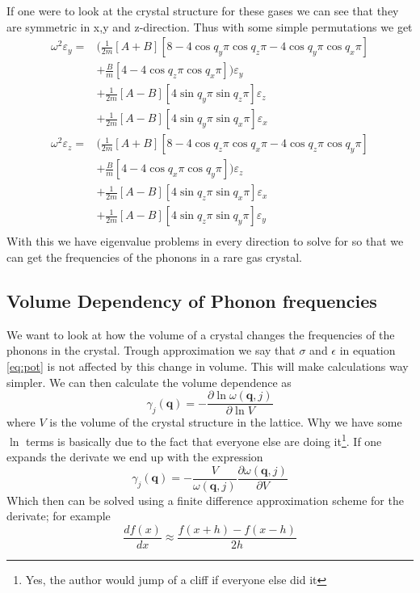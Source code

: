 \documentclass[11pt]{article}
\begin{document}
If one were to look at the crystal structure for these gases we can see that they are symmetric in x,y and z-direction. Thus with some simple permutations we get
\begin{align}
	\omega^2\varepsilon_y = &\big( \frac{1}{2m} [A+B][8-4\cos{q_y\pi}\cos{q_z\pi}-4\cos{q_y\pi}\cos{q_x\pi}] \\
	&+ \frac{B}{m}[4-4\cos{q_z\pi}\cos{q_x\pi}]\big)\varepsilon_y \\
	&+\frac{1}{2m}[A-B][4\sin{q_y\pi}\sin{q_z\pi}]\varepsilon_z \\
	&+\frac{1}{2m}[A-B][4\sin{q_y\pi}\sin{q_x\pi}]\varepsilon_x \\
	\omega^2\varepsilon_z = &\big( \frac{1}{2m} [A+B][8-4\cos{q_z\pi}\cos{q_x\pi}-4\cos{q_z\pi}\cos{q_y\pi}] \\
	&+ \frac{B}{m}[4-4\cos{q_x\pi}\cos{q_y\pi}]\big)\varepsilon_z \\
	&+\frac{1}{2m}[A-B][4\sin{q_z\pi}\sin{q_x\pi}]\varepsilon_x \\
	&+\frac{1}{2m}[A-B][4\sin{q_z\pi}\sin{q_y\pi}]\varepsilon_y \\
	\label{eq:omegaRest}
\end{align}
With this we have eigenvalue problems in every direction to solve for so that we can get the frequencies of the phonons in a rare gas crystal.
\subsection{Volume Dependency of Phonon frequencies}
We want to look at how the volume of a crystal changes the frequencies of the phonons in the crystal. Trough approximation we say that $\sigma$ and $\epsilon$ in equation \ref{eq:pot} is not affected by this change in volume. This will make calculations way simpler. We can then calculate the volume dependence as 
\begin{equation}
	\gamma_j(\mathbf{q}) = - \frac{\partial \ln{ \omega(\mathbf{q},j)}}{\partial \ln{V}}
\end{equation}
where $V$ is the volume of the crystal structure in the lattice. Why we have some $\ln$ terms is basically due to the fact that everyone else are doing it\footnote{Yes, the author would jump of a cliff if everyone else did it}. If one expands the derivate we end up with the expression
\begin{equation}
	\gamma_j(\mathbf{q}) =  -\frac{V}{\omega(\mathbf{q},j)} \frac{\partial \omega(\mathbf{q},j)}{\partial V}
	\label{eq:volDep}
\end{equation}
Which then can be solved using a finite difference approximation scheme for the derivate; for example
\begin{equation}
	\frac{df(x)}{dx} \approx \frac{f(x+h)-f(x-h)}{2h}
	\label{eq:derivate}
\end{equation}
\end{document}
